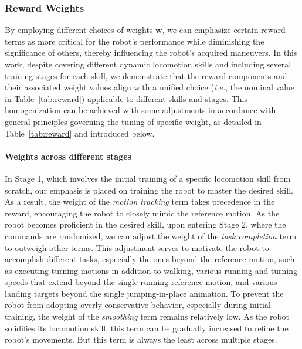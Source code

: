 \subsubsection{Reward Weights}
By employing different choices of weights $\mathbf{w}$, we can emphasize certain reward terms as more critical for the robot's performance while diminishing the significance of others, thereby influencing the robot's acquired maneuvers. 
In this work, despite covering different dynamic locomotion skills and including several training stages for each skill, we demonstrate that the reward components and their associated weight values align with a unified choice (\textit{i.e.}, the nominal value in Table~\ref{tab:reward}) applicable to different skills and stages. 
This homogenization can be achieved with some adjustments in accordance with general principles governing the tuning of specific weight, as detailed in Table~\ref{tab:reward} and introduced below. 

\paragraph{Weights across different stages}
In Stage 1, which involves the initial training of a specific locomotion skill from scratch, our emphasis is placed on training the robot to master the desired skill. As a result, the weight of the \textit{motion tracking} term takes precedence in the reward, encouraging the robot to closely mimic the reference motion.
As the robot becomes proficient in the desired skill, upon entering Stage 2, where the commands are randomized, we can adjust the weight of the \textit{task completion} term to outweigh other terms. 
This adjustment serves to motivate the robot to accomplish different tasks, especially the ones beyond the reference motion, such as executing turning motions in addition to walking, various running and turning speeds that extend beyond the single running reference motion, and various landing targets beyond the single jumping-in-place animation.
To prevent the robot from adopting overly conservative behavior, especially during initial training, the weight of the \textit{smoothing} term remains relatively low. 
As the robot solidifies its locomotion skill, this term can be gradually increased to refine the robot's movements.
But this term is always the least across multiple stages. 


